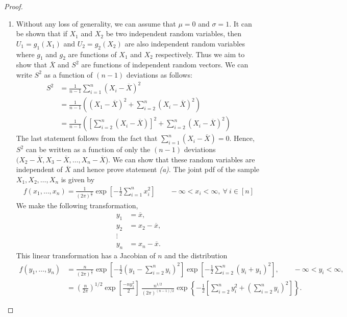 \documentclass[a4paper,english,12pt]{article}
\begin{document}
\begin{proof}
\renewcommand{\labelenumi}{\alph{enumi})}
\begin{enumerate}
\item Without any loss of generality, we can assume that $\mu=0$ and $\sigma=1$. It can be shown that if $X_1$ and $X_2$ be two independent random variables, then $U_1=g_1(X_1)$ and $U_2=g_2(X_2)$ are also independent random variables where $g_1$ and $g_2$ are functions of $X_1$ and $X_2$ respectively. Thus we aim to show that $\overline{X}$ and $S^2$ are functions of independent random vectors.   
We can write $S^2$ as a function of $(n-1)$ deviations as follows: 
\begin{align}
S^2&=\frac{1}{n-1}\sum_{i=1}^n(X_i-\overline{X})^2 \nonumber \\
&= \frac{1}{n-1}\left((X_1-\overline{X})^2+\sum_{i=2}^n
(X_i-\overline{X})^2\right) \nonumber \\
&=\frac{1}{n-1}\left(\left[\sum_{i=2}^n(X_i-\overline{X})\right]^2+\sum_{i=2}^n(X_i-\overline{X})^2\right)
\end{align}
The last statement follows from the fact that $\sum_{i=1}^n(X_i-\overline{X})=0$. Hence, $S^2$ can be written as a function of only the $(n-1)$ deviations   $(X_2-\overline{X},X_3-\overline{X},\dots,X_n-\overline{X}$). We can show that these random variables are independent of $\overline{X}$ and hence prove statement \textit{(a)}. The joint pdf of the sample $X_1,X_2,\dots,X_n$ is given by 
\begin{align}
f(x_1,\dots,x_n)=\frac{1}{{(2\pi)}^{\frac{n}{2}}}\exp\left[-\frac{1}{2}\sum_{i=1}^n x_i^2\right]  \qquad - \infty <x_i< \infty,~\forall~i\in [n]
\end{align}
We make the following transformation, 
\begin{align}
y_1&=\overline{x},  \nonumber \\
y_2&=x_2-\overline{x}, \nonumber \\
\vdots \nonumber \\
y_n&=x_n-\overline{x}.
\end{align}
This linear transformation has a Jacobian of $n$ and the distribution 
\begin{align}
f(y_1,\dots ,y_n)
&= \frac{n}{{(2\pi)}^{\frac{n}{2}}}\exp\left[-\frac{1}{2}(y_1-\sum_{i=2}^ny_i)^2\right]\exp\left[-\frac{1}{2}\sum_{i=2}^n(y_i+y_1)^2\right], \qquad - \infty < y_i <\infty, \nonumber \\
&=  {\left( \frac{n}{2\pi}\right)}^{1/2}\exp\left[\frac{-ny_1^2}{2}\right]~  \frac{n^{1/2}}{(2\pi)^{(n-1)/2}}\exp\left\lbrace-\frac{1}{2}\left[{\sum_{i=2}^ny_i^2+\left(\sum_{i=2}^ny_i\right)^2}\right]\right\rbrace.

\end{align}
\end{enumerate}
\end{proof}
\end{document}
